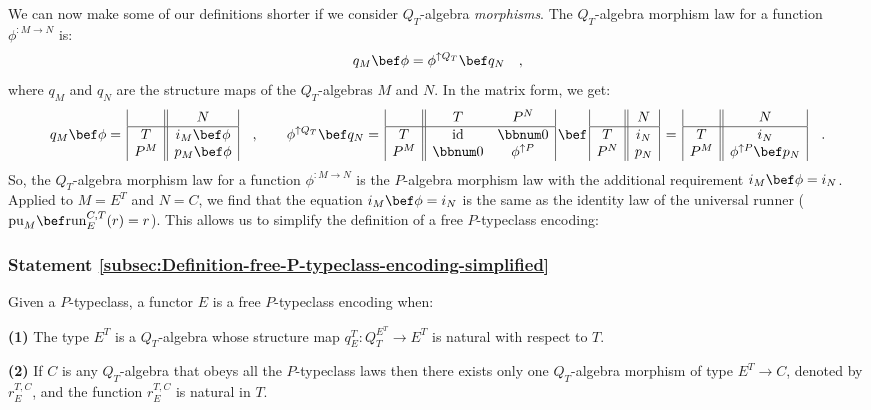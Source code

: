 We can now make some of our definitions shorter if we consider $Q_{T}$-algebra
\emph{morphisms}. The $Q_{T}$-algebra morphism law for a function
$\phi^{:M\rightarrow N}$ is:
\[
q_{M}\bef\phi=\phi^{\uparrow Q_{T}}\bef q_{N}\quad,
\]
where $q_{M}$ and $q_{N}$ are the structure maps of the $Q_{T}$-algebras
$M$ and $N$. In the matrix form, we get:
\[
q_{M}\bef\phi=\,\begin{array}{|c||c|}
 & N\\
\hline T & i_{M}\bef\phi\\
P^{M} & p_{M}\bef\phi
\end{array}\quad,\quad\quad\phi^{\uparrow Q_{T}}\bef q_{N}=\,\begin{array}{|c||cc|}
 & T & P^{N}\\
\hline T & \text{id} & \bbnum 0\\
P^{M} & \bbnum 0 & \phi^{\uparrow P}
\end{array}\,\bef\,\begin{array}{|c||c|}
 & N\\
\hline T & i_{N}\\
P^{N} & p_{N}
\end{array}\,=\,\begin{array}{|c||c|}
 & N\\
\hline T & i_{N}\\
P^{M} & \phi^{\uparrow P}\bef p_{N}
\end{array}\quad.
\]
So, the $Q_{T}$-algebra morphism law for a function $\phi^{:M\rightarrow N}$
is the $P$-algebra morphism law with the additional requirement $i_{M}\bef\phi=i_{N}$.
Applied to $M=E^{T}$ and $N=C$, we find that the equation $i_{M}\bef\phi=i_{N}$
is the same as the identity law of the universal runner ($\text{pu}_{M}\bef\text{run}_{E}^{C,T}(r)=r$).
This allows us to simplify the definition of a free $P$-typeclass
encoding:

\subsubsection{Statement \label{subsec:Definition-free-P-typeclass-encoding-simplified}\ref{subsec:Definition-free-P-typeclass-encoding-simplified}}

Given a $P$-typeclass, a functor $E$ is a free $P$-typeclass encoding
when:

\textbf{(1)} The type $E^{T}$ is a $Q_{T}$-algebra whose structure
map $q_{E}^{T}:Q_{T}^{E^{T}}\rightarrow E^{T}$ is natural with respect
to $T$.

\textbf{(2)} If $C$ is any $Q_{T}$-algebra that obeys all the $P$-typeclass
laws then there exists only one $Q_{T}$-algebra morphism of type
$E^{T}\rightarrow C$, denoted by $r_{E}^{T,C}$, and the function
$r_{E}^{T,C}$ is natural in $T$. 

